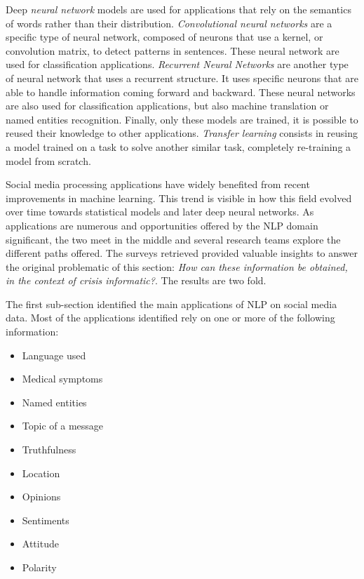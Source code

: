Deep \emph{neural network} models are used for applications that rely on the semantics of words rather than their distribution.
\emph{Convolutional neural networks} are a specific type of neural network, composed of neurons that use a kernel, or convolution matrix, to detect patterns in sentences.
These neural network are used for classification applications.
\emph{Recurrent Neural Networks} are another type of neural network that uses a recurrent structure.
It uses specific neurons that are able to handle information coming forward and backward.
These neural networks are also used for classification applications, but also machine translation or named entities recognition.
Finally, only these models are trained, it is possible to reused their knowledge to other applications.
\emph{Transfer learning} consists in reusing a model trained on a task to solve another similar task, completely re-training a model from scratch.

Social media processing applications have widely benefited from recent improvements in machine learning.
This trend is visible in how this field evolved over time towards statistical models and later deep neural networks.
As applications are numerous and opportunities offered by the NLP domain significant, the two meet in the middle and several research teams explore the different paths offered.
The surveys retrieved provided valuable insights to answer the original problematic of this section: \emph{How can these information be obtained, in the context of crisis informatic?}.
The results are two fold.

The first sub-section identified the main applications of NLP on social media data.
Most of the applications identified rely on one or more of the following information:

\begin{itemize}
    \item Language used
    \item Medical symptoms
    \item Named entities
    \item Topic of a message
    \item Truthfulness
    \item Location
    \item Opinions
    \item Sentiments
    \item Attitude
    \item Polarity
\end{itemize}

